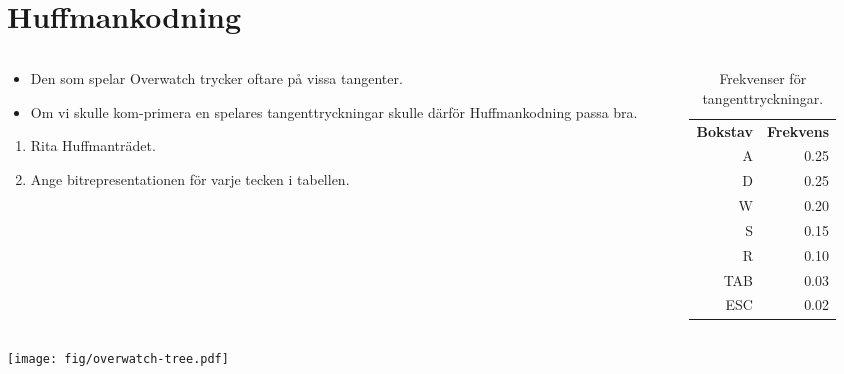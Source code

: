 \section{Huffmankodning}

\begin{frame}
  \begin{columns}
    \begin{column}{0.55\columnwidth}
      \begin{exercise}
        \begin{itemize}
          \item Den som spelar Overwatch trycker oftare på vissa tangenter.
          \item  Om vi skulle kom-primera en spelares tangenttryckningar skulle 
            därför Huffmankodning passa bra.
        \end{itemize}
        \begin{enumerate}
          \item Rita Huffmanträdet.
          \item Ange bitrepresentationen för varje tecken i tabellen.
        \end{enumerate}
      \end{exercise}
    \end{column}
    \begin{column}{0.35\columnwidth}
      \begin{table}
        \begin{tabular}{rr}
          \textbf{Bokstav} & \textbf{Frekvens} \\
          A & 0.25 \\
          D & 0.25 \\
          W & 0.20 \\
          S & 0.15 \\
          R & 0.10 \\
          TAB & 0.03 \\
          ESC & 0.02 \\
        \end{tabular}
        \caption{Frekvenser för tangenttryckningar.}
      \end{table}
    \end{column}
  \end{columns}
\end{frame}

\begin{frame}
  \centering
  \texttt{[image: fig/overwatch-tree.pdf]}
\end{frame}


